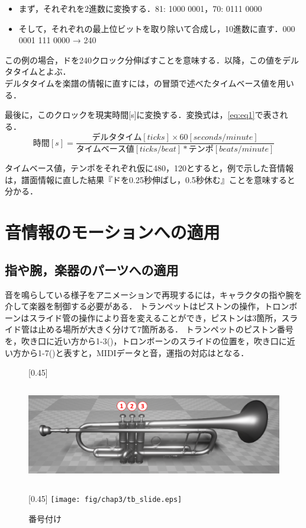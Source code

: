 \begin{itemize}
	\item まず，それぞれを2進数に変換する．\hspace{1mm}81: 1000 0001，70: 0111 0000
	\item そして，それぞれの最上位ビットを取り除いて合成し，10進数に直す．\hspace{1mm}000 0001 111 0000 → 240
\end{itemize}

この例の場合，ドを240クロック分伸ばすことを意味する．以降，この値をデルタタイムとよぶ．\\
\indent
デルタタイムを楽譜の情報に直すには，の冒頭で述べたタイムベース値を用いる．


最後に，このクロックを現実時間[s]に変換する．変換式は，\eqref{eq:eq1}で表される．
\begin{equation}
\label{eq:eq1}
時間[s] = 
\frac {デルタタイム[ticks] × 60[seconds/minute]}{タイムベース値[ticks/beat] * テンポ[beats/minute]}
\end{equation}

タイムベース値，テンポをそれぞれ仮に480，120とすると，例で示した音情報は，譜面情報に直した結果『ドを0.25秒伸ばし，0.5秒休む』ことを意味すると分かる．

\section{音情報のモーションへの適用} \label{adapt}
\subsection{指や腕，楽器のパーツへの適用}
音を鳴らしている様子をアニメーションで再現するには，キャラクタの指や腕を介して楽器を制御する必要がある．
トランペットはピストンの操作，トロンボーンはスライド管の操作により音を変えることができ，ピストンは3箇所，スライド管は止める場所が大きく分けて7箇所ある．
トランペットのピストン番号を，吹き口に近い方から1-3()，トロンボーンのスライドの位置を，吹き口に近い方から1-7()と表すと，MIDIデータと音，運指の対応はとなる．

\begin{figure}[t]
	\centering
	[0.45\linewidth]{
		\includegraphics[height=5cm]{fig/chap3/tp_piston.eps}}
	[0.45\linewidth]{
		\texttt{[image: fig/chap3/tb\_slide.eps]}}
	\caption{番号付け}
	\label{fig:numbering}
\end{figure}


